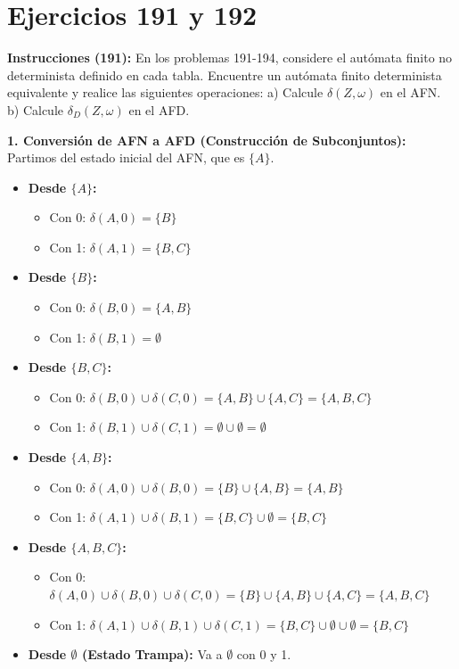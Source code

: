 \documentclass[12pt]{article}
\begin{document}
\section*{Ejercicios 191 y 192}

\textbf{Instrucciones (191):} En los problemas 191-194, considere el autómata finito no determinista definido en cada tabla. Encuentre un autómata finito determinista equivalente y realice las siguientes operaciones: a) Calcule $\delta(Z,\omega)$ en el AFN. b) Calcule $\delta_D(Z,\omega)$ en el AFD.

\vspace{0.5cm}

\textbf{1. Conversión de AFN a AFD (Construcción de Subconjuntos):} \\
Partimos del estado inicial del AFN, que es $\{A\}$.
\begin{itemize}
    \item \textbf{Desde $\{A\}$:} 
    \begin{itemize}
        \item Con 0: $\delta(A, 0) = \{B\}$
        \item Con 1: $\delta(A, 1) = \{B, C\}$
    \end{itemize}
    \item \textbf{Desde $\{B\}$:}
    \begin{itemize}
        \item Con 0: $\delta(B, 0) = \{A, B\}$
        \item Con 1: $\delta(B, 1) = \emptyset$
    \end{itemize}
    \item \textbf{Desde $\{B, C\}$:}
    \begin{itemize}
        \item Con 0: $\delta(B, 0) \cup \delta(C, 0) = \{A, B\} \cup \{A, C\} = \{A, B, C\}$
        \item Con 1: $\delta(B, 1) \cup \delta(C, 1) = \emptyset \cup \emptyset = \emptyset$
    \end{itemize}
    \item \textbf{Desde $\{A, B\}$:}
    \begin{itemize}
        \item Con 0: $\delta(A, 0) \cup \delta(B, 0) = \{B\} \cup \{A, B\} = \{A, B\}$
        \item Con 1: $\delta(A, 1) \cup \delta(B, 1) = \{B, C\} \cup \emptyset = \{B, C\}$
    \end{itemize}
    \item \textbf{Desde $\{A, B, C\}$:}
    \begin{itemize}
        \item Con 0: $\delta(A, 0) \cup \delta(B, 0) \cup \delta(C, 0) = \{B\} \cup \{A, B\} \cup \{A, C\} = \{A, B, C\}$
        \item Con 1: $\delta(A, 1) \cup \delta(B, 1) \cup \delta(C, 1) = \{B, C\} \cup \emptyset \cup \emptyset = \{B, C\}$
    \end{itemize}
    \item \textbf{Desde $\emptyset$ (Estado Trampa):} Va a $\emptyset$ con 0 y 1.
\end{itemize}
\end{document}

